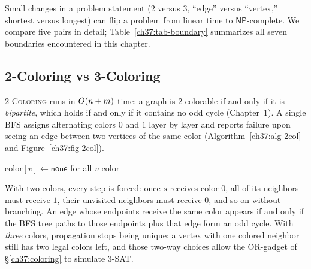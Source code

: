 Small changes in a problem statement ($2$
versus $3$, ``edge'' versus ``vertex,'' shortest versus longest) can flip a problem from linear time to
$\mathsf{NP}$-complete. We compare five pairs in detail; Table~\ref{ch37:tab-boundary} summarizes all seven boundaries encountered in this chapter.

\subsection{2-Coloring vs 3-Coloring}

\textsc{2-Coloring} runs in $O(n+m)$ time: a graph is 2-colorable if and only if it is
\emph{bipartite}, which holds if and only if it contains no odd cycle (Chapter~1). A single BFS
assigns alternating colors $0$ and $1$ layer by layer and reports failure upon seeing an edge between two vertices of the same color
(Algorithm~\ref{ch37:alg-2col} and Figure~\ref{ch37:fig-2col}).

\begin{algorithm}[htbp]
\caption{\textsc{Two-Color}$(\Gph)$ -- bipartiteness by BFS}
\label{ch37:alg-2col}
\DontPrintSemicolon
{}
$\mathrm{color}[v]\gets\textsf{none}$ for all $v$\;
\Return $\mathrm{color}$\;
\end{algorithm}

\begin{whybox}
With two colors, every step is forced: once $s$ receives color $0$, all of its neighbors
must receive $1$, their unvisited neighbors must receive $0$, and so on without branching.
An edge whose endpoints receive the same color appears if and only if the BFS tree paths to those endpoints plus that edge form an odd cycle.
With \emph{three} colors, propagation stops being unique: a vertex with one colored neighbor still has two legal colors left,
and those two-way choices allow the OR-gadget of \S\ref{ch37:coloring} to simulate \textsc{3-SAT}.
\end{whybox}


